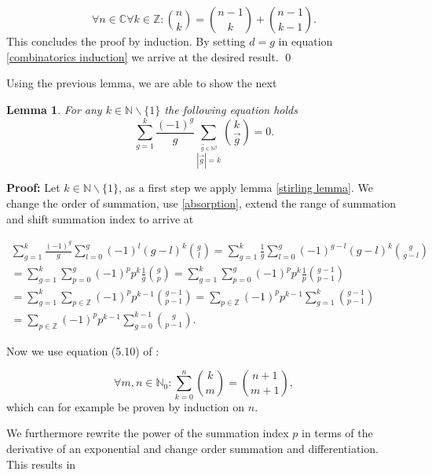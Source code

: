 \documentclass[b5paper,draft,openbib,12pt]{memoir}
\newtheorem{Lemma}[Def]{Lemma}
\begin{document}
\begin{equation}
\forall n\in \mathbb{C} \forall k \in \mathbb{Z}: \binom{n}{k} = \binom{n-1}{k} + \binom{n-1}{k-1}.
\end{equation}
This concludes the proof by induction. By setting \(d=g\) in equation \eqref{combinatorics induction} 
we arrive at the desired result. \qed

Using the previous lemma, we are able to show the next

\begin{Lemma}\label{combinatorics weak conjecture lemma 2}
For any \(k \in \mathbb{N}\backslash \{1\}\) the following equation holds
\begin{equation}
\sum_{g=1}^k \frac{(-1)^g}{g} \sum_{\stackrel{\vec{g}\in\mathbb{N}^g}{|\vec{g}|=k}}\binom{k}{\vec{g}}=0.
\end{equation}
\end{Lemma}
\textbf{Proof:} Let \(k\in\mathbb{N}\backslash\{1\}\), as a first step we apply lemma \ref{stirling lemma}.
We change the order of summation, use \eqref{absorption}, extend the range of summation and shift 
summation index  to arrive at

\begin{multline}
\sum_{g=1}^k \frac{(-1)^g}{g} \sum_{l=0}^g (-1)^l (g-l)^k \binom{g}{l}
= \sum_{g=1}^k \frac{1}{g} \sum_{l=0}^g (-1)^{g-l} (g-l)^k \binom{g}{g-l}\\
= \sum_{g=1}^k \sum_{p=0}^g (-1)^{p} p^k \frac{1}{g} \binom{g}{p}
=\sum_{g=1}^k \sum_{p=0}^g (-1)^{p} p^k \frac{1}{p} \binom{g-1}{p-1}\\
=\sum_{g=1}^k \sum_{p\in\mathbb{Z}} (-1)^{p} p^{k-1}\binom{g-1}{p-1}
=\sum_{p\in\mathbb{Z}} (-1)^{p} p^{k-1} \sum_{g=1}^k \binom{g-1}{p-1}\\
=\sum_{p\in\mathbb{Z}} (-1)^{p} p^{k-1} \sum_{g=0}^{k-1} \binom{g}{p-1}.
\end{multline}

Now we use equation (5.10) of \cite{graham1994concrete}:

\begin{equation}\tag{upper summation}
\forall m,n\in\mathbb{N}_0: \sum_{k=0}^n \binom{k}{m} = \binom{n+1}{m+1},
\end{equation}
which can for example be proven by induction on \(n\).

We furthermore rewrite the power of the summation index \(p\) in terms of the derivative of an 
exponential and change order summation and differentiation. This results in
\end{document}
